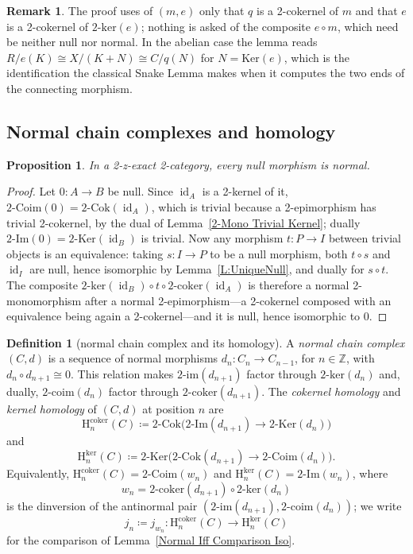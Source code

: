 \documentclass[reqno,a4paper]{amsart}
\numberwithin{equation}{section}
\theoremstyle{plain}
\newtheorem{proposition}[subsection]{Proposition}
\theoremstyle{definition}
\newtheorem{definition}[subsection]{Definition}
\newtheorem{remark}[subsection]{Remark}
\def\nameit#1{\textrm{#1}~}
\def\lemx{\nameit{Lemma}}
\def\dfn#1{{\itshape #1}}
\newcommand{\comp}{\circ}
\newcommand{\iso}{\cong}
\renewcommand{\1}{\onecat{1}}
\newcommand{\Ker}{\ensuremath{\mathrm{Ker}}}
\newcommand{\coker}{\ensuremath{\mathrm{coker}}}
\newcommand{\TwoKer}{\ensuremath{2\text{-}\mathrm{Ker}}}
\newcommand{\TwoCoker}{\ensuremath{2\text{-}\mathrm{Cok}}}
\newcommand{\twoker}{\ensuremath{2\text{-}\mathrm{ker}}}
\newcommand{\twocoker}{\ensuremath{2\text{-}\mathrm{coker}}}
\newcommand{\TwoImg}{\ensuremath{2\text{-}\mathrm{Im}}}
\newcommand{\twoimg}{\ensuremath{2\text{-}\mathrm{im}}}
\newcommand{\TwoCoim}{\ensuremath{2\text{-}\mathrm{Coim}}}
\newcommand{\twocoim}{\ensuremath{2\text{-}\mathrm{coim}}}
\newcommand{\Hker}[2]{\ensuremath{\mathrm{H}^{\ker}_{#1}(#2)}}
\newcommand{\Hcoker}[2]{\ensuremath{\mathrm{H}^{\coker}_{#1}(#2)}}
\newcommand{\id}[1]{\operatorname{id}_{#1}}
\begin{document}
\begin{remark}\label{Rem Dinversion Coker}
	The proof uses of \((m,e)\) only that \(q\) is a 2-cokernel of \(m\) and that \(e\) is a 2-cokernel of \(\twoker(e)\); nothing is asked of the composite \(e\comp m\), which need be neither null nor normal. In the abelian case the lemma reads \(R/e(K)\iso X/(K+N)\iso C/q(N)\) for \(N=\Ker(e)\), which is the identification the classical Snake Lemma makes when it computes the two ends of the connecting morphism.
\end{remark}

\subsection{Normal chain complexes and homology}\label{SS:Homology}

\begin{proposition}\label{P:NullNormal}
	In a 2-z-exact 2-category, every null morphism is normal.
\end{proposition}
\begin{proof}
	Let \(0\colon A\to B\) be null. Since \(\id{A}\) is a 2-kernel of it, \(\TwoCoim(0)=\TwoCoker(\id{A})\), which is trivial because a 2-epimorphism has trivial 2-cokernel, by the dual of \lemx\ref{2-Mono Trivial Kernel}; dually \(\TwoImg(0)=\TwoKer(\id{B})\) is trivial. Now any morphism \(t\colon P\to I\) between trivial objects is an equivalence: taking \(s\colon I\to P\) to be a null morphism, both \(t\comp s\) and \(\id{I}\) are null, hence isomorphic by \lemx\ref{L:UniqueNull}, and dually for \(s\comp t\). The composite \(\twoker(\id{B})\comp t\comp\twocoker(\id{A})\) is therefore a normal 2-monomorphism after a normal 2-epimorphism---a 2-cokernel composed with an equivalence being again a 2-cokernel---and it is null, hence isomorphic to \(0\).
\end{proof}

\begin{definition}[normal chain complex and its homology]\label{Def:Homology}
	A \dfn{normal chain complex} \((C,d)\) is a sequence of normal morphisms \(d_n\colon C_n\to C_{n-1}\), for \(n\in\mathbb{Z}\), with \(d_n\comp d_{n+1}\iso 0\). This relation makes \(\twoimg(d_{n+1})\) factor through \(\twoker(d_n)\) and, dually, \(\twocoim(d_n)\) factor through \(\twocoker(d_{n+1})\). The \dfn{cokernel homology} and \dfn{kernel homology} of \((C,d)\) at position \(n\) are
	\[
		\Hcoker{n}{C}\coloneq\TwoCoker\bigl(\TwoImg(d_{n+1})\to\TwoKer(d_n)\bigr)
	\]
	and
	\[
		\Hker{n}{C}\coloneq\TwoKer\bigl(\TwoCoker(d_{n+1})\to\TwoCoim(d_n)\bigr)\text{.}
	\]
	Equivalently, \(\Hcoker{n}{C}=\TwoCoim(w_n)\) and \(\Hker{n}{C}=\TwoImg(w_n)\), where
	\[
		w_n=\twocoker(d_{n+1})\comp\twoker(d_n)
	\]
	is the dinversion of the antinormal pair \((\twoimg(d_{n+1}),\twocoim(d_n))\); we write
	\[
		j_n\coloneq j_{w_n}\colon\Hcoker{n}{C}\to\Hker{n}{C}
	\]
	for the comparison of \lemx\ref{Normal Iff Comparison Iso}.
\end{definition}
\end{document}
